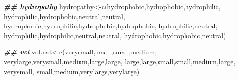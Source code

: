 \documentclass[
]{book}
\newenvironment{Shaded}{\begin{snugshade}}{\end{snugshade}}
\newcommand{\DocumentationTok}[1]{\textcolor[rgb]{0.56,0.35,0.01}{\textbf{\textit{#1}}}}
\newcommand{\FunctionTok}[1]{\textcolor[rgb]{0.00,0.00,0.00}{#1}}
\newcommand{\NormalTok}[1]{#1}
\newcommand{\OtherTok}[1]{\textcolor[rgb]{0.56,0.35,0.01}{#1}}
\newcommand{\StringTok}[1]{\textcolor[rgb]{0.31,0.60,0.02}{#1}}
\begin{document}
\begin{Shaded}
\begin{Highlighting}[]
\DocumentationTok{\#\# hydropathy}
\NormalTok{hydropathy}\OtherTok{\textless{}{-}}\FunctionTok{c}\NormalTok{(}\StringTok{\textquotesingle{}hydrophobic\textquotesingle{}}\NormalTok{,}\StringTok{\textquotesingle{}hydrophobic\textquotesingle{}}\NormalTok{,}\StringTok{\textquotesingle{}hydrophilic\textquotesingle{}}\NormalTok{,}\StringTok{\textquotesingle{}}
\StringTok{              hydrophilic\textquotesingle{}}\NormalTok{,}\StringTok{\textquotesingle{}hydrophobic\textquotesingle{}}\NormalTok{,}\StringTok{\textquotesingle{}neutral\textquotesingle{}}\NormalTok{,}\StringTok{\textquotesingle{}neutral\textquotesingle{}}\NormalTok{,}
              \StringTok{\textquotesingle{}hydrophobic\textquotesingle{}}\NormalTok{,}\StringTok{\textquotesingle{}hydrophilic\textquotesingle{}}\NormalTok{,}\StringTok{\textquotesingle{}hydrophobic\textquotesingle{}}\NormalTok{,}\StringTok{\textquotesingle{}hydrophobic\textquotesingle{}}\NormalTok{,}
              \StringTok{\textquotesingle{}hydrophilic\textquotesingle{}}\NormalTok{,}\StringTok{\textquotesingle{}neutral\textquotesingle{}}\NormalTok{,}
              \StringTok{\textquotesingle{}hydrophilic\textquotesingle{}}\NormalTok{,}\StringTok{\textquotesingle{}hydrophilic\textquotesingle{}}\NormalTok{,}\StringTok{\textquotesingle{}neutral\textquotesingle{}}\NormalTok{,}\StringTok{\textquotesingle{}neutral\textquotesingle{}}\NormalTok{,}
              \StringTok{\textquotesingle{}hydrophobic\textquotesingle{}}\NormalTok{,}\StringTok{\textquotesingle{}hydrophobic\textquotesingle{}}\NormalTok{,}\StringTok{\textquotesingle{}neutral\textquotesingle{}}\NormalTok{)}

\DocumentationTok{\#\# vol}
\NormalTok{vol.cat}\OtherTok{\textless{}{-}}\FunctionTok{c}\NormalTok{(}\StringTok{\textquotesingle{}verysmall\textquotesingle{}}\NormalTok{,}\StringTok{\textquotesingle{}small\textquotesingle{}}\NormalTok{,}\StringTok{\textquotesingle{}small\textquotesingle{}}\NormalTok{,}\StringTok{\textquotesingle{}medium\textquotesingle{}}\NormalTok{,}
              \StringTok{\textquotesingle{}verylarge\textquotesingle{}}\NormalTok{,}\StringTok{\textquotesingle{}verysmall\textquotesingle{}}\NormalTok{,}\StringTok{\textquotesingle{}medium\textquotesingle{}}\NormalTok{,}\StringTok{\textquotesingle{}large\textquotesingle{}}\NormalTok{,}\StringTok{\textquotesingle{}large\textquotesingle{}}\NormalTok{,}
              \StringTok{\textquotesingle{}large\textquotesingle{}}\NormalTok{,}\StringTok{\textquotesingle{}large\textquotesingle{}}\NormalTok{,}\StringTok{\textquotesingle{}small\textquotesingle{}}\NormalTok{,}\StringTok{\textquotesingle{}small\textquotesingle{}}\NormalTok{,}\StringTok{\textquotesingle{}medium\textquotesingle{}}\NormalTok{,}\StringTok{\textquotesingle{}large\textquotesingle{}}\NormalTok{,}
              \StringTok{\textquotesingle{}verysmall\textquotesingle{}}\NormalTok{,}
              \StringTok{\textquotesingle{}small\textquotesingle{}}\NormalTok{,}\StringTok{\textquotesingle{}medium\textquotesingle{}}\NormalTok{,}\StringTok{\textquotesingle{}verylarge\textquotesingle{}}\NormalTok{,}\StringTok{\textquotesingle{}verylarge\textquotesingle{}}\NormalTok{)}


\end{Highlighting}
\end{Shaded}
\end{document}
